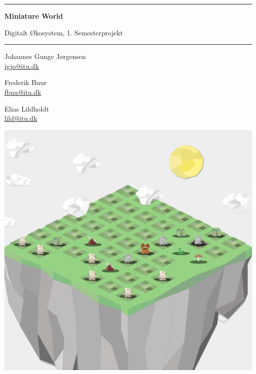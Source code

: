 \documentclass[12pt]{article}
\begin{document}
\begin{titlepage}
    \centering

    \vspace*{1cm}

    \rule{\textwidth}{1pt}

    \vspace{.7\baselineskip}
    {\huge \textbf{Miniature World}}

    \vspace*{.5cm}
    {\LARGE Digitalt Økosystem, 1. Semesterprojekt}
    
    \rule{\textwidth}{1pt}

    \vspace{1cm}

    \large

    \begin{minipage}{.5\textwidth}
        \centering
        Johannes Gunge Jørgensen \\
        {\normalsize \url{jgjo@itu.dk}}
    \end{minipage}%
    \begin{minipage}{.5\textwidth}
        \centering
        Frederik Buur\\
        {\normalsize \url{fbuu@itu.dk}}
    \end{minipage}
    \begin{minipage}{.5\textwidth}
        \centering
        Elias Lildholdt \\
        {\normalsize \url{lild@itu.dk}}
    \end{minipage}


    \vspace{3cm}

    \includegraphics[width=.7\textwidth]{./screenshot.png}


\end{titlepage}
\end{document}
